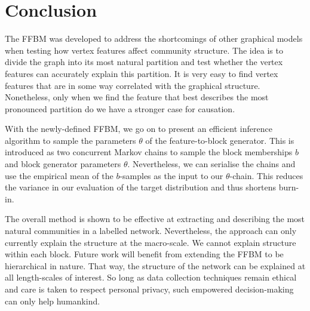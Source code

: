 \section{Conclusion}
\label{sec:conclusion}

The FFBM was developed to address the shortcomings of other graphical models when testing how vertex features affect community structure. The idea is to divide the graph into its most natural partition and test whether the vertex features can accurately explain this partition. It is very easy to find vertex features that are in some way correlated with the graphical structure. Nonetheless, only when we find the feature that best describes the most pronounced partition do we have a stronger case for causation.

With the newly-defined FFBM, we go on to present an efficient inference algorithm to sample the parameters $\theta$ of the feature-to-block generator. This is introduced as two concurrent Markov chains to sample the block memberships $b$ and block generator parameters $\theta$. Nevertheless, we can serialise the chains and use the empirical mean of the $b$-samples as the input to our $\theta$-chain. This reduces the variance in our evaluation of the target distribution and thus shortens burn-in.

The overall method is shown to be effective at extracting and describing the most natural communities in a labelled network. Nevertheless, the approach can only currently explain the structure at the macro-scale. We cannot explain structure within each block. Future work will benefit from extending the FFBM to be hierarchical in nature. That way, the structure of the network can be explained at all length-scales of interest. So long as data collection techniques remain ethical and care is taken to respect personal privacy, such empowered decision-making can only help humankind.